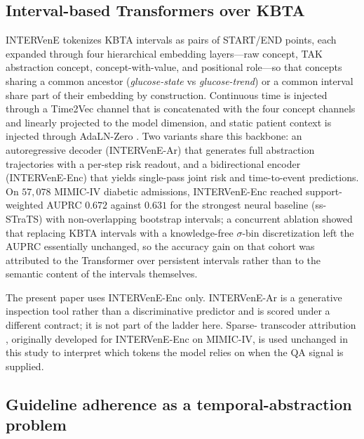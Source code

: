 \subsection{Interval-based Transformers over KBTA}

INTERVenE \citep{oded2027intervene} tokenizes KBTA intervals as pairs of
START/END points, each expanded through four hierarchical embedding
layers---raw concept, TAK abstraction concept, concept-with-value, and
positional role---so that concepts sharing a common ancestor
(\emph{glucose-state} vs \emph{glucose-trend}) or a common interval share
part of their embedding by construction. Continuous time is injected
through a Time2Vec \citep{kazemi2019time2vec} channel that is concatenated
with the four concept channels and linearly projected to the model
dimension, and static patient context is injected through AdaLN-Zero
\citep{peebles2023adaln0}. Two variants share this backbone: an
autoregressive decoder (INTERVenE-Ar) that generates full abstraction
trajectories with a per-step risk readout, and a bidirectional encoder
(INTERVenE-Enc) that yields single-pass joint risk and time-to-event
predictions. On $57{,}078$ MIMIC-IV diabetic admissions, INTERVenE-Enc
reached support-weighted AUPRC $0.672$ against $0.631$ for the strongest
neural baseline (ss-STraTS) with non-overlapping bootstrap intervals; a
concurrent ablation showed that replacing KBTA intervals with a
knowledge-free $\sigma$-bin discretization left the AUPRC essentially
unchanged, so the accuracy gain on that cohort was attributed to the
Transformer over persistent intervals rather than to the semantic content
of the intervals themselves.

The present paper uses INTERVenE-Enc only. INTERVenE-Ar is a generative
inspection tool rather than a discriminative predictor and is scored
under a different contract; it is not part of the ladder here. Sparse-
transcoder attribution \citep{dunefsky2024transcoders,rajamanoharan2024jumping},
originally developed for INTERVenE-Enc on MIMIC-IV, is used unchanged in
this study to interpret which tokens the model relies on when the QA
signal is supplied.

\subsection{Guideline adherence as a temporal-abstraction problem}

